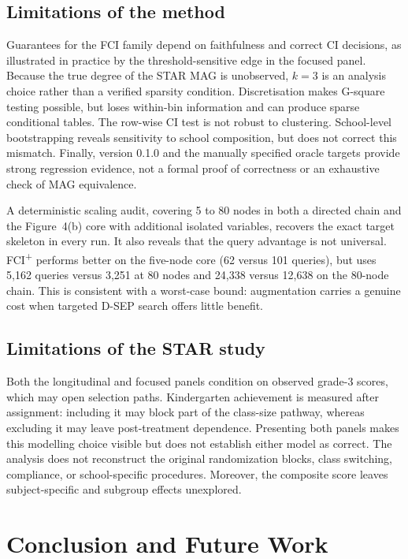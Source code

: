 \documentclass[11pt,a4paper]{article}
\theoremstyle{definition}
\newcommand{\FCIplus}{FCI\textsuperscript{+}}
\begin{document}
\subsection{Limitations of the method}

Guarantees for the FCI family depend on faithfulness and correct CI decisions,
as illustrated in practice by the threshold-sensitive edge in the focused
panel. Because the true degree of the STAR MAG is unobserved, \(k=3\) is an
analysis choice rather than a verified sparsity condition. Discretisation
makes G-square testing possible, but loses within-bin information and can
produce sparse conditional tables. The row-wise CI test is not robust to
clustering. School-level bootstrapping reveals sensitivity to school
composition, but does not correct this mismatch. Finally, version 0.1.0 and
the manually specified oracle targets provide strong regression evidence,
not a formal proof of correctness or an exhaustive check of MAG equivalence.

A deterministic scaling audit, covering 5 to 80 nodes in both a directed
chain and the Figure~4(b) core with additional isolated variables, recovers
the exact target skeleton in every run. It also reveals that the query
advantage is not universal. \FCIplus{} performs better on the five-node core
(62 versus 101 queries), but uses 5,162 queries versus 3,251 at 80 nodes and
24,338 versus 12,638 on the 80-node chain. This is consistent with a
worst-case bound: augmentation carries a genuine cost when targeted D-SEP
search offers little benefit.

\subsection{Limitations of the STAR study}

Both the longitudinal and focused panels condition on observed grade-3 scores,
which may open selection paths. Kindergarten achievement is measured after
assignment: including it may block part of the class-size pathway, whereas
excluding it may leave post-treatment dependence. Presenting both panels
makes this modelling choice visible but does not establish either model as
correct. The analysis does not reconstruct the original randomization blocks,
class switching, compliance, or school-specific procedures. Moreover, the
composite score leaves subject-specific and subgroup effects unexplored.

\section{Conclusion and Future Work}
\label{sec:conclusions}
\end{document}
